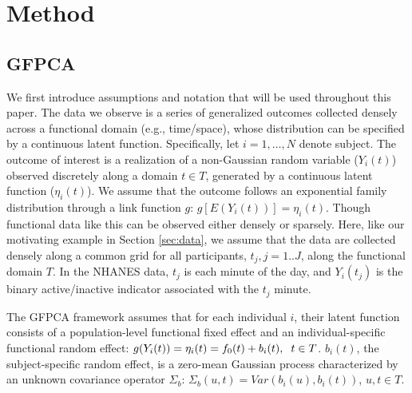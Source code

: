 \documentclass[12pt]{article}
\begin{document}
\section{Method}
\label{sec:method}

\subsection{GFPCA}
\label{subsec:gfpca}

We first introduce assumptions and notation that will be used throughout this paper. The data we observe is a series of generalized outcomes collected densely across a functional domain (e.g., time/space), whose distribution can be specified by a continuous latent function. Specifically, let $i=1,\ldots,N$ denote subject. The outcome of interest is a realization of a non-Gaussian random variable ($Y_i(t)$) observed discretely along a domain $t \in T$, generated by a continuous latent function ($\eta_i(t)$). We assume that the outcome follows an exponential family distribution through a link function $g$: $g[E(Y_i(t))] = \eta_i(t)$. Though functional data like this can be observed either densely or sparsely. Here, like our motivating example in Section \ref{sec:data}, we assume that the data are collected densely along a common grid for all participants, ${t_j, j = 1..J}$, along the functional domain $T$. In the NHANES data, $t_j$ is each minute of the day, and $Y_i(t_j)$ is the binary active/inactive indicator associated with the $t_j$ minute. 

The GFPCA framework assumes that for each individual $i$, their latent function consists of a population-level functional fixed effect and an individual-specific functional random effect: $g(Y_i(t)) = \eta_i(t) = f_0(t)+ b_i(t), \hspace{0.2cm} t  \in T$. $b_i(t)$, the subject-specific random effect, is a zero-mean Gaussian process characterized by an unknown covariance operator $\Sigma_b$: $\Sigma_b(u, t) = Var(b_i(u), b_i(t))$, $u,t \in T$.
\end{document}
